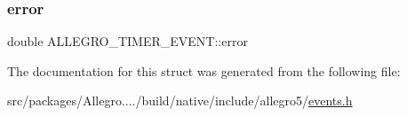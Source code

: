 \subsubsection{\texorpdfstring{error}{error}}
{\footnotesize\ttfamily double A\+L\+L\+E\+G\+R\+O\+\_\+\+T\+I\+M\+E\+R\+\_\+\+E\+V\+E\+N\+T\+::error}



The documentation for this struct was generated from the following file\+:\begin{DoxyCompactItemize}
\item 
src/packages/\+Allegro..../build/native/include/allegro5/\hyperlink{events_8h}{events.\+h}\end{DoxyCompactItemize}
